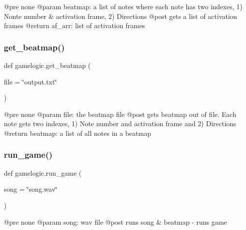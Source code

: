 \begin{DoxyVerb}@pre none
@param beatmap: a list of notes where each note has two indexes, 1) Nonte number & activation frame, 2) Directions
@post gets a list of activation frames
@return af_arr: list of activation frames
\end{DoxyVerb}
 \mbox{\label{namespacegamelogic_a6a186cca17da365aaedb4e791cdd9989}} 
\subsubsection{\texorpdfstring{get\+\_\+beatmap()}{get\_beatmap()}}
{\footnotesize\ttfamily def gamelogic.\+get\+\_\+beatmap (\begin{DoxyParamCaption}\item[{}]{file = {\ttfamily \char`\"{}output.txt\char`\"{}} }\end{DoxyParamCaption})}

\begin{DoxyVerb}@pre none
@param file: the beatmap file
@post gets beatmap out of file. Each note gets two indexes, 1) Note number and activation frame and 2) Directions
@return beatmap: a list of all notes in a beatmap
\end{DoxyVerb}
 \mbox{\label{namespacegamelogic_af89bec3eb64303877585a65db089f86d}} 
\subsubsection{\texorpdfstring{run\+\_\+game()}{run\_game()}}
{\footnotesize\ttfamily def gamelogic.\+run\+\_\+game (\begin{DoxyParamCaption}\item[{}]{song = {\ttfamily \char`\"{}song.wav\char`\"{}} }\end{DoxyParamCaption})}

\begin{DoxyVerb}@pre none
@param song: wav file
@post runs song & beatmap - runs game
\end{DoxyVerb}
 